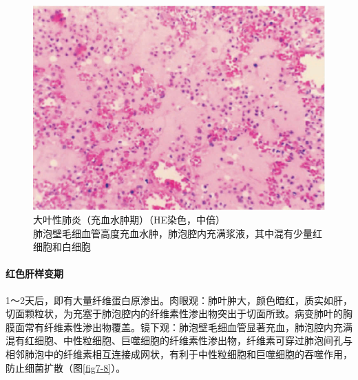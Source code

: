 \begin{figure}[!htbp]
 \centering
 \includegraphics{./images/Image00116.jpg}
 \captionsetup{justification=centering}
 \caption{大叶性肺炎（充血水肿期）（HE染色，中倍）\\ {\small 肺泡壁毛细血管高度充血水肿，肺泡腔内充满浆液，其中混有少量红细胞和白细胞}}
\label{fig7-7}
  \end{figure}

\paragraph{红色肝样变期}
1～2天后，即有大量纤维蛋白原渗出。肉眼观：肺叶肿大，颜色暗红，质实如肝，切面颗粒状，为充塞于肺泡腔内的纤维素性渗出物突出于切面所致。病变肺叶的胸膜面常有纤维素性渗出物覆盖。镜下观：肺泡壁毛细血管显著充血，肺泡腔内充满混有红细胞、中性粒细胞、巨噬细胞的纤维素性渗出物，纤维素可穿过肺泡间孔与相邻肺泡中的纤维素相互连接成网状，有利于中性粒细胞和巨噬细胞的吞噬作用，防止细菌扩散（图\ref{fig7-8}）。


